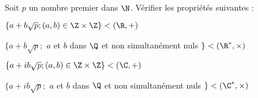 Soit $p$ un nombre premier dans $\N$. Vérifier les propriétés suivantes : 

$\{ a + b \sqrt{p}; (a,b) \in \Z \times \Z \} < (\R, +)$

$\{ a + b \sqrt{p};$ $a$ et $b$ dans $\Q$ et non simultanément nuls $\} < (\R^\ast, \times)$

$\{ a + ib \sqrt{p}; (a,b) \in \Z \times \Z \} < (\C, +)$

$\{ a + ib \sqrt{p};$ $a$ et $b$ dans $\Q$ et non simultanément nuls $\} < (\C^\ast, \times)$
